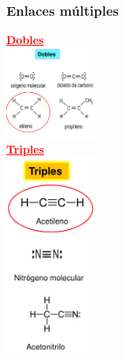         \subsubsection{Enlaces múltiples}
        \begin{center} \textcolor{red}{\textbf{\underline{Dobles}}} \\[5pt] \includegraphics[width=3cm]{./imagenes/enlacesDobles.png} \\[10pt] \textcolor{red}{\textbf{\underline{Triples}}} \\[5pt] \includegraphics[width=3cm]{./imagenes/enlacesTriples.png} \end{center}

